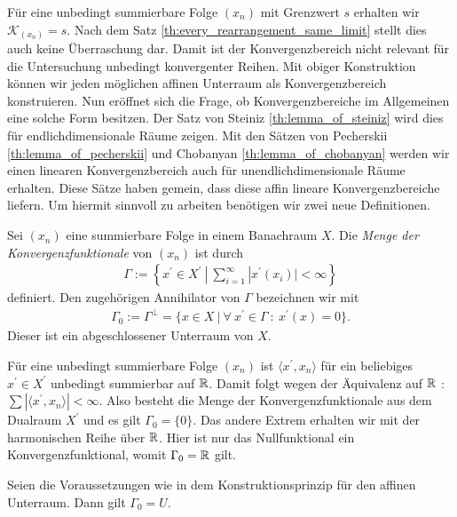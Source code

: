 Für eine unbedingt summierbare Folge $ (x_n) $ mit Grenzwert $ s $ erhalten wir $ \mathcal{K}_{(x_n)} = s$.
Nach dem Satz \ref{th:every_rearrangement_same_limit} stellt dies auch keine Überraschung dar. 
Damit ist der Konvergenzbereich nicht relevant für die Untersuchung unbedingt konvergenter Reihen.
Mit obiger Konstruktion können wir jeden möglichen affinen Unterraum als Konvergenzbereich konstruieren. 
Nun eröffnet sich die Frage, ob Konvergenzbereiche im Allgemeinen eine solche Form besitzen.
Der Satz von Steiniz \ref{th:lemma_of_steiniz} wird dies für endlichdimensionale Räume zeigen.
Mit den Sätzen von Pecherskii \ref{th:lemma_of_pecherskii} und Chobanyan \ref{th:lemma_of_chobanyan} werden wir einen linearen Konvergenzbereich auch für unendlichdimensionale Räume erhalten.
Diese Sätze haben gemein, dass diese affin lineare Konvergenzbereiche liefern. Um hiermit sinnvoll zu arbeiten benötigen wir zwei neue Definitionen.



\begin{df}
	Sei $ (x_n) $ eine summierbare Folge in einem Banachraum $ X $.
	Die \textit{Menge der Konvergenzfunktionale} von $ (x_n) $ ist durch
	\begin{align}
		\Gamma :=
		\left\{
		x^\prime \in X^\prime \ | \ \sum \limits_{i=1}^\infty |x^\prime(x_i)| < \infty
		\right\}
	\end{align}
	definiert. 
	Den zugehörigen Annihilator von $ \Gamma $ bezeichnen wir mit
	\begin{align*}
		\Gamma_0 := \Gamma^\bot =  \{ x \in X \ | \ \forall \ x^\prime \in \Gamma  \ : \ x^\prime(x) = 0 \}. 
	\end{align*}
	Dieser ist ein abgeschlossener Unterraum von $ X $.
\end{df}

Für eine unbedingt summierbare Folge $ (x_n) $  ist $ \langle x^\prime, x_n \rangle$ für ein beliebiges $ x^\prime \in X^\prime$ unbedingt summierbar auf $ \mathbb{R} $.
Damit folgt wegen der Äquivalenz auf $ \mathbb{R} $ : $ \sum  |\langle x^\prime, x_n \rangle |< \infty $. Also besteht die Menge der Konvergenzfunktionale aus dem Dualraum $ X^\prime $ und es gilt $ \Gamma_0 = \{0\} $.
Das andere Extrem erhalten wir mit der harmonischen Reihe über $ \mathbb{R} $. Hier ist nur das Nullfunktional ein Konvergenzfunktional, womit $ \Gamma_0 = \mathbb{R} $ gilt.

\begin{lem}
	Seien die Voraussetzungen wie in dem Konstruktionsprinzip für den affinen Unterraum.
	Dann gilt $ \Gamma_0 = U $.
\end{lem}

